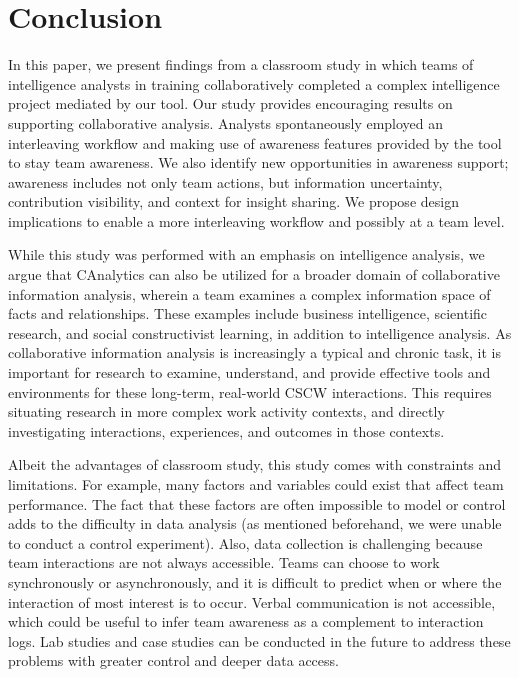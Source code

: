 \section{Conclusion}

In this paper, we present findings from a classroom study in which teams of intelligence analysts in training collaboratively completed a complex intelligence project mediated by our tool. Our study provides encouraging results on supporting collaborative analysis. Analysts spontaneously employed an interleaving workflow and making use of awareness features provided by the tool to stay team awareness. We also identify new opportunities in awareness support; awareness includes not only team actions, but information uncertainty, contribution visibility, and context for insight sharing. We propose design implications to enable a more interleaving workflow and possibly at a team level.

While this study was performed with an emphasis on intelligence analysis, we argue that CAnalytics can also be utilized for a broader domain of collaborative information analysis, wherein a team examines a complex information space of facts and relationships. These examples include business intelligence, scientific research, and social constructivist learning, in addition to intelligence analysis. As collaborative information analysis is increasingly a typical and chronic task, it is important for research to examine, understand, and provide effective tools and environments for these long-term, real-world CSCW interactions. This requires situating research in more complex work activity contexts, and directly investigating interactions, experiences, and outcomes in those contexts.

Albeit the advantages of classroom study, this study comes with constraints and limitations. For example, many factors and
variables could exist that affect team performance. The fact that these
factors are often impossible to model or control adds to the difficulty
in data analysis (as mentioned beforehand, we were unable to conduct a control experiment). Also, data collection is
challenging because team interactions are not always accessible. Teams
can choose to work synchronously or asynchronously, and it is difficult
to predict when or where the interaction of most interest is to occur.
Verbal communication is not accessible, which could be useful to infer
team awareness as a complement to interaction logs. Lab studies
and case studies can be conducted in the future to address these
problems with greater control and deeper data access.


